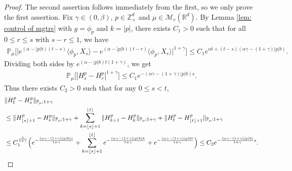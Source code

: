 \documentclass[12pt,a4paper]{amsart}
\theoremstyle{plain}
\theoremstyle{definition}
\numberwithin{equation}{section}
\begin{document}
\begin{proof}
  The second assertion follows immediately from the first, so we only prove the first assertion.
  Fix $\gamma \in (0,\beta)$, $p\in \mathbb{Z}_+^d$ and $\mu\in \mathcal M_c(\mathbb R^d)$.
  By Lemma \ref{lem: control of mgtrs} with $g=\phi_p$ and $k=|p|$, there exists $C_1>0$ such that for all $0\leq r\leq s $ with $s-r\leq1$, we have
\begin{align}
  \mathbb{P}_{\mu}\Big[\big|e^{(\alpha-|p|b)(t-s)}\langle\phi_p, X_s\rangle-e^{(\alpha-|p|b)(t-r)}\langle\phi_p, X_r\rangle\big|^{1+\gamma}\Big]
  \leq C_1e^{\alpha t+(t-s)(\alpha\gamma-(1+\gamma)|p|b)}.
\end{align}
Dividing both sides by $e^{(\alpha-|p|b) t(1+\gamma)}$, we get
\begin{align}
  \mathbb{P}_{\mu}\big[|H^p_s-H^p_r|^{1+\gamma}\big]
  \leq  C_1 e^{-(\alpha\gamma-(1+\gamma)|p|b)s}.
\end{align}
Thus there exists $C_2>0$ such that for any $0\leq s<t$,
\begin{align}
	& \|H^p_t-H^p_s\|_{\mathbb{P}_{\mu};1+\gamma}
	\\ & \leq \|H^p_{\lfloor s \rfloor+1}-H^p_s\|_{\mathbb{P}_{\mu};1+\gamma}+\sum_{k=\lfloor s \rfloor+1}^{\lfloor t \rfloor}\|H^p_{k+1}-H^p_{k}\|_{\mathbb{P}_{\mu};1+\gamma}+\|H^p_t-H^p_{\lfloor t \rfloor+1}\|_{\mathbb{P}_{\mu};1+\gamma}
	\\ & \leq C_1^{\frac{1}{1+\gamma}} \Big(e^{-\frac{(\alpha \gamma-(1+\gamma)|p|b) s}{1+\gamma}}+\sum_{k=\lfloor s \rfloor+1}^{\lfloor t \rfloor}e^{-\frac{(\alpha \gamma-(1+\gamma)|p|b) k}{1+\gamma}}+ e^{-\frac{(\alpha \gamma-(1+\gamma)|p|b t}{1+\gamma}}\Big)
         \leq C_2e^{-\frac{(\alpha \gamma-(1+\gamma)|p|b)}{1+\gamma}s}.
         \qedhere
\end{align}	
\end{proof}
\end{document}
